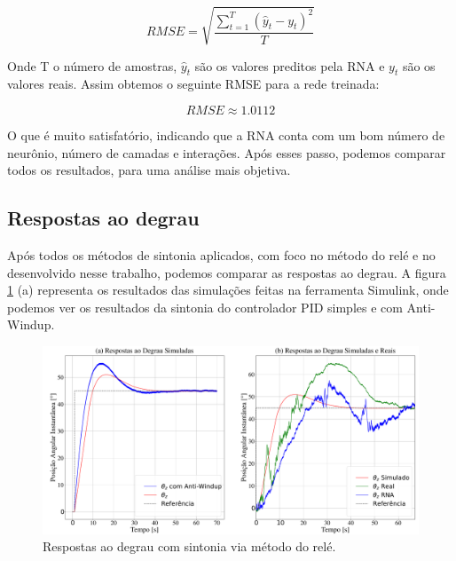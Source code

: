 \begin{equation}
RMSE = \sqrt{\frac{\sum_{t=1}^{T}(\hat{y}_t-y_t)^2}{T}}
\end{equation}

Onde T o número de amostras, $\hat{y}_t$ são os valores preditos pela RNA e $y_t$ são os valores reais. Assim obtemos o seguinte RMSE para a rede treinada:

\begin{equation}
RMSE \approx 1.0112
\end{equation}

O que é muito satisfatório, indicando que a RNA conta com um bom número de neurônio, número de camadas e interações. Após esses passo, podemos comparar todos os resultados, para uma análise mais objetiva. 



\subsection{Respostas ao degrau}

Após todos os métodos de sintonia aplicados, com foco no método do relé e no desenvolvido nesse trabalho, podemos comparar as respostas ao degrau. A figura \ref{fig:pid_result} (a) representa os resultados das simulações feitas na ferramenta Simulink, onde podemos ver os resultados da sintonia do controlador PID simples e com Anti-Windup.

\begin{figure}[H]
  \caption{Respostas ao degrau com sintonia via método do relé.}
  \begin{center}
      \includegraphics[width=\textwidth]{resultados/img/pid_result}
  \end{center}
  \label{fig:pid_result}
\end{figure}

